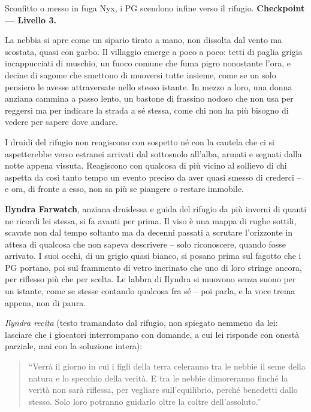 Sconfitto o messo in fuga Nyx, i PG scendono infine verso il rifugio. \textbf{Checkpoint --- Livello 3.}

\begin{DndReadAloud}[]
  La nebbia si apre come un sipario tirato a mano, non dissolta dal vento ma scostata, quasi con garbo. Il villaggio emerge a poco a poco: tetti di paglia grigia incappucciati di muschio, un fuoco comune che fuma pigro nonostante l'ora, e decine di sagome che smettono di muoversi tutte insieme, come se un solo pensiero le avesse attraversate nello stesso istante. In mezzo a loro, una donna anziana cammina a passo lento, un bastone di frassino nodoso che non usa per reggersi ma per indicare la strada a sé stessa, come chi non ha più bisogno di vedere per sapere dove andare.
\end{DndReadAloud}

I druidi del rifugio non reagiscono con sospetto né con la cautela che ci si aspetterebbe verso estranei arrivati dal sottosuolo all'alba, armati e segnati dalla notte appena vissuta. Reagiscono con qualcosa di più vicino al sollievo di chi aspetta da così tanto tempo un evento preciso da aver quasi smesso di crederci -- e ora, di fronte a esso, non sa più se piangere o restare immobile.

\textbf{Ilyndra Farwatch}, anziana druidessa e guida del rifugio da più inverni di quanti ne ricordi lei stessa, si fa avanti per prima. Il viso è una mappa di rughe sottili, scavate non dal tempo soltanto ma da decenni passati a scrutare l'orizzonte in attesa di qualcosa che non sapeva descrivere -- solo riconoscere, quando fosse arrivato. I suoi occhi, di un grigio quasi bianco, si posano prima sul fagotto che i PG portano, poi sul frammento di vetro incrinato che uno di loro stringe ancora, per riflesso più che per scelta. Le labbra di Ilyndra si muovono senza suono per un istante, come se stesse contando qualcosa fra sé -- poi parla, e la voce trema appena, non di paura.

\textit{Ilyndra recita} (testo tramandato dal rifugio, non spiegato nemmeno da lei: lasciare che i giocatori interrompano con domande, a cui lei risponde con onestà parziale, mai con la soluzione intera):

\begin{quotation}
\noindent ``Verrà il giorno in cui i figli della terra celeranno tra le nebbie il seme della natura e lo specchio della verità. E tra le nebbie dimoreranno finché la verità non sarà riflessa, per vegliare sull'equilibrio, perché benedetti dallo stesso. Solo loro potranno guidarlo oltre la coltre dell'assoluto.''
\end{quotation}

